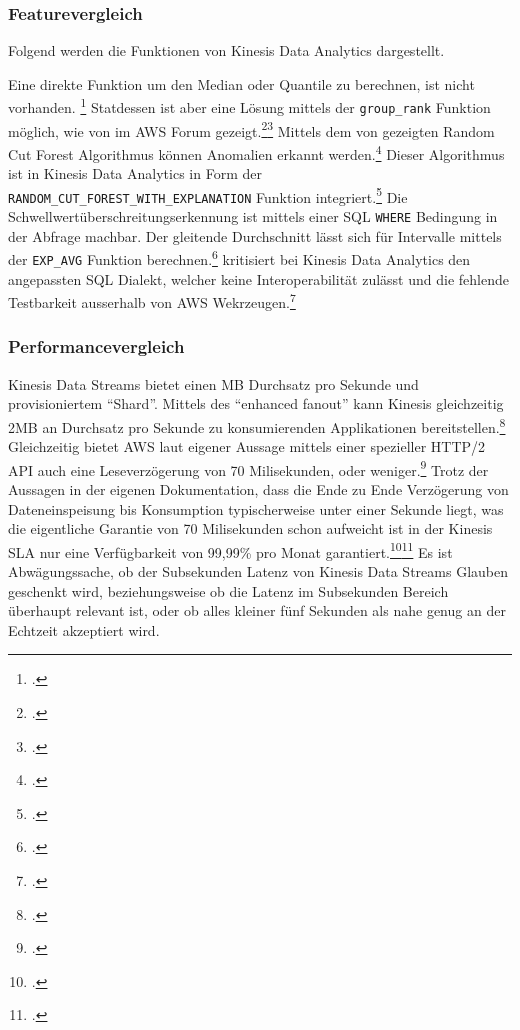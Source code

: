 \subsubsection{Featurevergleich}
Folgend werden die Funktionen von Kinesis Data Analytics dargestellt. 

Eine direkte Funktion um den Median oder Quantile zu berechnen, ist nicht vorhanden. \footcite[Vgl.][]{RyanN.2018} Statdessen ist aber eine Lösung mittels der \texttt{group_rank} Funktion möglich, wie von \citeauthor{RyanN.2018} im \ac{AWS} Forum gezeigt.\footcite[Vgl.][]{AmazonWebServicesInc..o.J.as}\nzitat\footcite[Vgl.][]{RyanN.2018}
Mittels dem von \citeauthor{Guha.2016} gezeigten Random Cut Forest Algorithmus können Anomalien erkannt werden.\footcite[Vgl.][1]{Guha.2016} Dieser Algorithmus ist in Kinesis Data Analytics in Form der \\ \texttt{RANDOM_CUT_FOREST_WITH_EXPLANATION} Funktion integriert.\footcite[Vgl.][]{AmazonWebServicesInc..o.J.ar}
Die Schwellwertüberschreitungserkennung ist mittels einer \ac{SQL} \texttt{WHERE} Bedingung in der Abfrage machbar.
Der gleitende Durchschnitt lässt sich für Intervalle mittels der \texttt{EXP_AVG} Funktion berechnen.\footcite[Vgl.][]{AmazonWebServicesInc..o.J.aq}
\citeauthor{Herman.2020} kritisiert bei Kinesis Data Analytics den angepassten \ac{SQL} Dialekt, welcher keine Interoperabilität zulässt und die fehlende Testbarkeit ausserhalb von \ac{AWS} Wekrzeugen.\footcite[Vgl.][]{Herman.2020}

\subsubsection{Performancevergleich}
Kinesis Data Streams bietet einen MB Durchsatz pro Sekunde und provisioniertem \enquote{Shard}. Mittels des \enquote{enhanced fanout} kann Kinesis gleichzeitig 2MB an Durchsatz pro Sekunde zu konsumierenden Applikationen bereitstellen.\footcite[Vgl. auch im Folgenden][]{Hunt.2018} Gleichzeitig bietet \ac{AWS} laut eigener Aussage mittels einer spezieller HTTP/2 \ac{API} auch eine Leseverzögerung von 70 Milisekunden, oder weniger.\footcite[Vgl.][]{AmazonWebServicesInc..o.J.af} Trotz der Aussagen in der eigenen Dokumentation, dass die Ende zu Ende Verzögerung von Dateneinspeisung bis Konsumption typischerweise unter einer Sekunde liegt, was die eigentliche Garantie von 70 Milisekunden schon aufweicht  ist in der Kinesis \ac{SLA} nur eine Verfügbarkeit von 99,99\% pro Monat garantiert.\footcite[Vgl.][]{AmazonWebServicesInc..o.J.ae}\nzitat\footcite[Vgl.][]{AmazonWebServicesInc..o.J.ad} Es ist Abwägungssache, ob der Subsekunden Latenz von Kinesis Data Streams Glauben geschenkt wird, beziehungsweise ob die Latenz im Subsekunden Bereich überhaupt relevant ist, oder ob alles kleiner fünf Sekunden als nahe genug an der Echtzeit akzeptiert wird.

